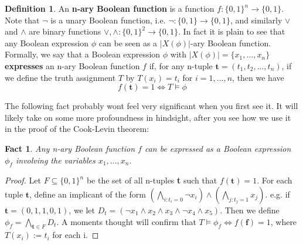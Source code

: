\documentclass{article}
\theoremstyle{definition}
\newtheorem{definition}{Definition}[section]
\theoremstyle{plain}
\theoremstyle{theorem}
\newtheorem{fact}{Fact}[section]
\begin{document}
\begin{definition}
An \textbf{n-ary Boolean function} is a function $f:\{0,1\}^n \to \{0,1\}$. Note that $\neg$ is a unary Boolean function, i.e. $\neg:\{0,1\} \to \{0,1\}$, and similarly $\vee$ and $\wedge$ are binary functions $\vee,\wedge:\{0,1\}^2 \to \{0,1\}$. In fact it is plain to see that any Boolean expression $\phi$ can be seen as a $|X(\phi)|$-ary Boolean function. Formally, we say that a Boolean expression $\phi$ with $|X(\phi)|=\{x_1,...,x_n\}$ \textbf{expresses} an n-ary Boolean function $f$ if, for any n-tuple $\textbf{t} = (t_1,t_2,...,t_n)$, if we define the truth assignment $T$ by $T(x_i)=t_i$ for $i=1,...,n$, then we have 
\[f(\textbf{t}) = 1 \iff T \models \phi \]
\end{definition}
The following fact probably wont feel very significant when you first see it. It will likely take on some more profoundness in hindsight, after you see how we use it in the proof of the Cook-Levin theorem:
\begin{fact}
    Any n-ary Boolean function $f$ can be expressed as a Boolean expression $\phi_f$ involving the variables $x_1,...,x_n$.
\end{fact}
\begin{proof}
    Let $F \subseteq \{0,1\}^n$ be the set of all n-tuples \textbf{t} such that $f(\textbf{t}) = 1$. For each tuple $\textbf{t}$, define an implicant of the form $(\underset{i:t_i=0}{\bigwedge}\neg x_i) \wedge (\underset{j:t_j=1}{\bigwedge} x_j)$. e.g. if $\textbf{t}=(0,1,1,0,1)$, we let $D_t = (\neg x_1 \wedge x_2 \wedge x_3 \wedge \neg x_4 \wedge x_5)$. Then we define $\phi_f = \underset{\textbf{t} \in F}{\bigwedge}D_t$. A moments thought will confirm that $T \models \phi_f \iff f(\textbf{f})=1$, where $T(x_i) := t_i$ for each i.
\end{proof}
\end{document}
